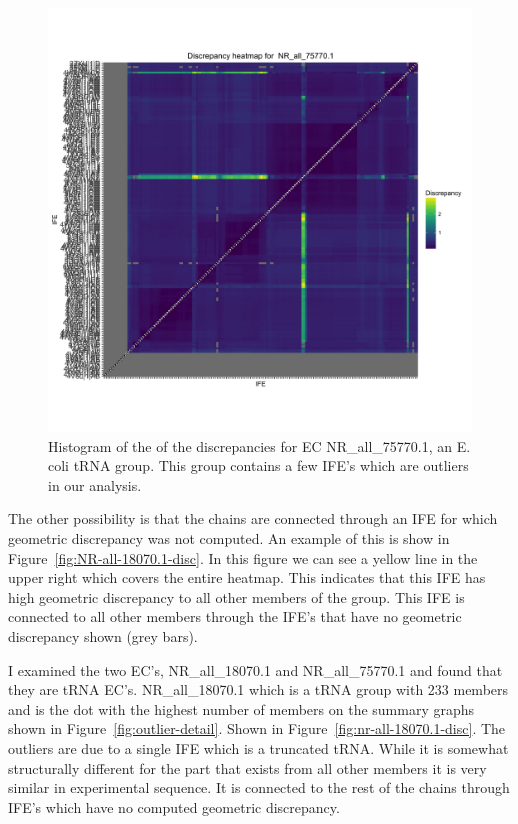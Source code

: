 \begin{figure}[h]
  \includegraphics[width=\linewidth]{chapter-3/figs/nr-all-75770-1-disc}
  \caption{Histogram of the of the discrepancies for EC NR\_all\_75770.1, an E.
    coli tRNA group. This group contains a few IFE's which are outliers in our
  analysis.}
  \label{fig:nr-all-75770.1-disc}
\end{figure}

The other possibility is that the chains are connected through an IFE for which
geometric discrepancy was not computed. An example of this is show in
Figure~\ref{fig:NR-all-18070.1-disc}. In this figure we can see a yellow line in
the upper right which covers the entire heatmap. This indicates that this IFE
has high geometric discrepancy to all other members of the group. This IFE is connected to
all other members through the IFE's that have no geometric discrepancy shown (grey bars).

I examined the two EC's, NR\_all\_18070.1 and NR\_all\_75770.1 and found that
they are tRNA EC's. NR\_all\_18070.1 which is a tRNA group with 233 members and
is the dot with the highest number of members on the summary graphs shown in
Figure~\ref{fig:outlier-detail}. Shown in Figure~\ref{fig:nr-all-18070.1-disc}.
The outliers are due to a single IFE which is a truncated tRNA. While it is
somewhat structurally different for the part that exists from all other members
it is very similar in experimental sequence. It is connected to the rest of the
chains through IFE's which have no computed geometric discrepancy.

